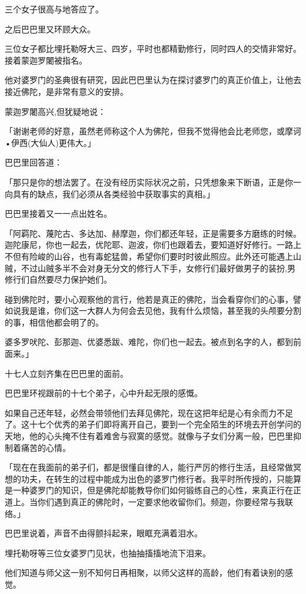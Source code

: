 \documentclass[twoside,openany]{book}
\begin{document}
三个女子很高与地答应了。

之后巴巴里又环顾大众。

三位女子都比埋托勒呀大三、四岁，平时也都精勤修行，同时四人的交情非常好。接着蒙迦罗闍被指名。

他对婆罗门的圣典很有研究，因此巴巴里认为在探讨婆罗门的真正价值上，让他去接近佛陀，是非常有意义的安排。

蒙迦罗闍高兴,但犹疑地说：

「谢谢老师的好意，虽然老师称这个人为佛陀，但我不觉得他会比老师您，或摩诃•伊西(大仙人)更伟大。」

巴巴里回答道：

「那只是你的想法罢了。在没有经历实际状况之前，只凭想象来下断语，正是你一向具有的缺点，我们必须从各类经验中获取事实的真相。」

巴巴里接着又一一点出姓名。

「阿羁陀、蔑陀古、多达加、赫摩迦，你们都还年轻，正是需要多方磨练的时候。迦陀康尼，你也一起去，优陀耶、迦波，你们也跟着去，要知道好好修行。一路上不但有险峻的山谷，也有毒蛇猛兽，希望你们要时时彼此照应。此外还可能遇上山贼，不过山贼多半不会对身无分文的修行人下手，女修行们最好做男子的装扮,男修行们自然要尽力保护她们。

碰到佛陀时，要小心观察他的言行，他若是真正的佛陀，当会看穿你们的心事，譬如说我是谁，你们这一大群人为何会去见他，我有什么烦恼，甚至我的头颅要分割的事，相信他都会明了的。

婆多罗吠陀、彭那迦、优婆悉跋、难陀，你们也一起去。被点到名字的人，都到前面来。」

十七人立刻齐集在巴巴里的面前。

巴巴里环视跟前的十七个弟子，心中升起无限的感慨。

如果自己还年轻，必然会带领他们去拜见佛陀，现在这把年纪是心有余而力不足了。这十七个优秀的弟子们即将离开自己，要到一个完全陌生的环境去开创学问的天地，他的心头掩不住有着难舍与寂寞的感觉。就像与子女们分离一般，巴巴里抑制着痛苦的心情。

「现在在我面前的弟子们，都是很懂自律的人，能行严厉的修行生活，且经常做冥想的功夫，在转生的过程中能成为出色的婆罗门修行者。我平时所传授的，只能算是一种婆罗门的知识，但是佛陀却能教导你们如何锻练自己的心性，来真正行在正道上。当你们遇到真正的佛陀时，一定要求他收留你们。频迦，你要经常与我联络。」

巴巴里说着，声音不由得颤抖起来，眼眶充满着泪水。

埋托勒呀等三位女婆罗门见状，也抽抽搐搐地流下泪来。

他们知道与师父这一别不知何日再相聚，以师父这样的高龄，他们有着诀别的感觉。
\end{document}
